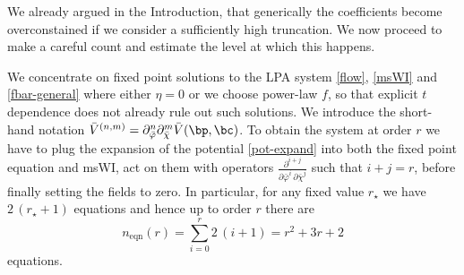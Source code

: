 \documentclass[11pt]{book} %
\begin{document}

We already argued in the Introduction, that generically the coefficients become overconstained if we consider a sufficiently high truncation. We now proceed to make a careful count and estimate the level at which this happens.




We concentrate on fixed point solutions to the LPA system \eqref{flow}, \eqref{msWI} and \eqref{fbar-general} where either $\eta=0$ or we choose power-law $f$, so that explicit $t$ dependence does not already rule out such solutions. We introduce the short-hand notation $\bar V ^{(n,m)}=\partial_{\bar \varphi}^n \partial_{\bar \chi}^m \bar V(\bp,\bc)$. 
To obtain the system at order $r$ we have to plug the expansion of the potential \eqref{pot-expand}
into both the fixed point equation and msWI, act on them with operators $\frac{\partial^{i+j}}{\partial \bar\varphi^i \, \partial \bar\chi^j}$ such that $i+j=r$, before finally setting the fields to zero. In particular, for any fixed value $r_{\star}$ we have $2 \, (r_{\star}+1)$ equations
and hence up to order $r$ there are
\begin{equation}
\label{number_eqns}
n_{\text{eqn}}(r) = \sum_{i=0}^{r} 2\,(i+1) = r^2 + 3r + 2 
\end{equation}
equations. 
\end{document}
